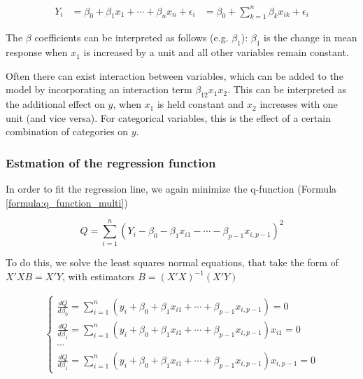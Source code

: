 \begin{equation}
    \begin{aligned}
        Y_i &= \beta_0 + \beta_1 x_1 + \cdots + \beta_n x_n + \epsilon_i
            &= \beta_0 + \sum_{k=1}^n \beta_k x_{ik} + \epsilon_i
    \end{aligned}
    \label{formula:multiple_linear_regression}
\end{equation}

The $\beta$ coefficients can be interpreted as follows (e.g. $\beta_1$): $\beta_1$ is the change in mean response when $x_1$ is increased by a unit and all other variables remain constant.

Often there can exist interaction between variables, which can be added to the model by incorporating an interaction term $\beta_{12} x_1 x_2$. This can be interpreted as the additional effect on $y$, when $x_1$ is held constant and $x_2$ increases with one unit (and vice versa). For categorical variables, this is the effect of a certain combination of categories on $y$.

\subsubsection{Estmation of the regression function}
In order to fit the regression line, we again minimize the q-function (Formula \ref{formula:q_function_multi})

\begin{equation}
    Q = \sum_{i=1}^n \left(Y_i - \beta_0 - \beta_1x_{i1} - \cdots - \beta_{p-1}x_{i, p-1}\right)^2
    \label{formula:q_function_multi}
\end{equation}

To do this, we solve the least squares normal equations, that take the form of $X'XB = X'Y$, with estimators $B = (X'X)^{-1} (X'Y)$

\begin{equation}
    \begin{aligned}
    \left\{
    \begin{aligned}
        \frac{dQ}{d\beta_0} = \sum_{i=1}^{n} (y_i + \beta_0 + \beta_1 x_{i1} + \cdots + \beta_{p-1} x_{i, p-1}) = 0 \\
        \frac{dQ}{d\beta_1} = \sum_{i=1}^{n} (y_i + \beta_0 + \beta_1 x_{i1} + \cdots + \beta_{p-1} x_{i, p-1})x_{i1} = 0 \\
        \cdots\\
        \frac{dQ}{d\beta_1} = \sum_{i=1}^{n} (y_i + \beta_0 + \beta_1 x_{i1} + \cdots + \beta_{p-1} x_{i, p-1})x_{i, p-1} = 0
    \end{aligned}
    \right.
    \end{aligned}
\end{equation}
